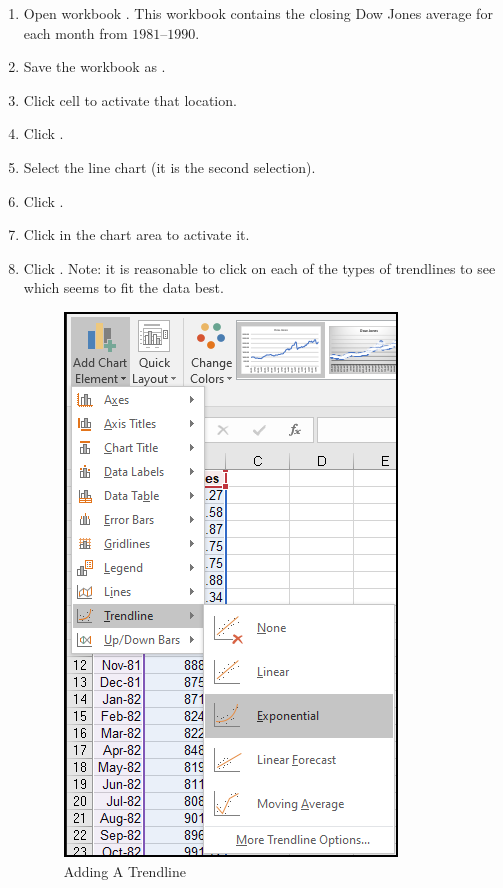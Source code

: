 \begin{enumbox}
	\begin{enumerate}
		\item Open workbook . This workbook contains the closing Dow Jones average for each month from $ 1981 $–$ 1990 $.
		\item Save the workbook as .
		\item Click cell  to activate that location.
		\item Click .
		\item Select the line chart (it is the second selection).
		\item Click .
		\item Click in the chart area to activate it.
		\item Click . Note: it is reasonable to click on each of the types of trendlines to see which seems to fit the data best.
	
		\begin{figure}[H]
			\centering
			\includegraphics[width=\maxwidth{.50\linewidth}]{gfx/ch08_fig07}
			\caption{Adding A Trendline}
			\label{08:fig07}
		\end{figure}
	

\end{enumerate}
\end{enumbox}
